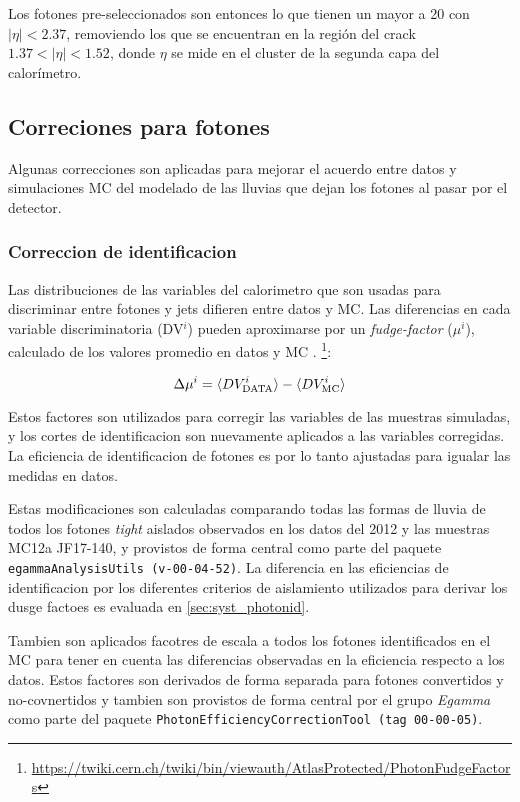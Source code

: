 Los fotones pre-seleccionados son entonces lo que tienen un {\pt} mayor a 20
{\gev} con $|\eta| < 2.37$, removiendo los que se encuentran en la región del
crack $1.37 < |\eta| < 1.52$, donde $\eta$ se mide en el cluster de la segunda
capa del calorímetro.


\subsection{Correciones para fotones}

Algunas correcciones son aplicadas para mejorar el acuerdo entre datos y
simulaciones MC del modelado de las lluvias que dejan los fotones al
pasar por el detector.

\subsubsection{Correccion de identificacion}

Las distribuciones de las variables del calorimetro que son usadas
para discriminar entre fotones y jets difieren entre datos y MC.
Las diferencias en cada variable discriminatoria (DV$^i$) pueden
aproximarse por un \emph{fudge-factor} ($\mu^i$), calculado de
los valores promedio en datos y MC \cite{ATLAS-CONF-2012-123}.
\footnote{\url{https://twiki.cern.ch/twiki/bin/viewauth/AtlasProtected/PhotonFudgeFactors}}:

\begin{equation}
  \Delta \mu^i = \langle DV^i_\text{DATA} \rangle - \langle DV^i_\mathrm{MC} \rangle
\end{equation}

Estos factores son utilizados para corregir las variables de las
muestras simuladas, y los cortes de identificacion son nuevamente
aplicados a las variables corregidas. La eficiencia de identificacion
de fotones es por lo tanto ajustadas para igualar las medidas en datos.

Estas modificaciones son calculadas comparando todas las formas de lluvia
de todos los fotones \emph{tight} aislados observados en los datos del 2012
y las muestras MC12a JF17-140, y provistos de forma central como parte del
paquete \texttt{egammaAnalysisUtils (v-00-04-52)}.
La diferencia en las eficiencias de identificacion por los diferentes
criterios de aislamiento utilizados para derivar los dusge factoes es
evaluada en \cref{sec:syst_photonid}.

Tambien son aplicados facotres de escala a todos los fotones identificados
en el MC para tener en cuenta las diferencias observadas en la eficiencia
respecto a los datos. Estos factores son derivados de forma separada para
fotones convertidos y no-covnertidos y tambien son provistos de forma central
por el grupo \emph{Egamma} como parte del paquete
\texttt{PhotonEfficiencyCorrectionTool (tag 00-00-05)}.

